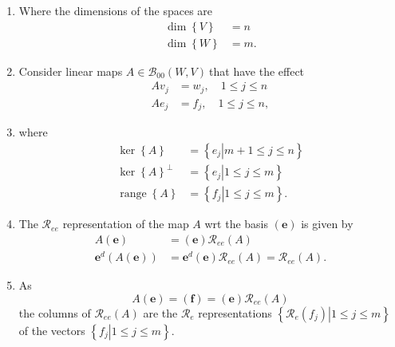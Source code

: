 \documentclass[aps,preprint]{revtex4}%
\begin{document}
\begin{enumerate}
\item Where the dimensions of the spaces are
\begin{align}
\dim\left\{  V\right\}   &  =n\\
\dim\left\{  W\right\}   &  =m.
\end{align}


\item Consider linear maps $A\in\mathcal{B}_{00}\left(  W,V\right)  \ $that
have the effect%
\begin{align}
Av_{j}  &  =w_{j},\quad1\leq j\leq n\\
Ae_{j}  &  =f_{j},\quad1\leq j\leq n,
\end{align}


\item where
\begin{align}
\ker\left\{  A\right\}   &  =\left\{  \left.  e_{j}\right\vert m+1\leq j\leq
n\right\} \\
\ker\left\{  A\right\}  ^{\bot}  &  =\left\{  \left.  e_{j}\right\vert 1\leq
j\leq m\right\} \\
\operatorname*{range}\left\{  A\right\}   &  =\left\{  \left.  f_{j}%
\right\vert 1\leq j\leq m\right\}  .
\end{align}


\item The $\mathcal{R}_{ee}$ representation of the map $A$ wrt the basis
$\left(  \boldsymbol{e}\right)  $ is given by
\begin{align}
A\left(  \boldsymbol{e}\right)   &  =\left(  \boldsymbol{e}\right)
\mathcal{R}_{ee}\left(  A\right) \\
\boldsymbol{e}^{d}\left(  A\left(  \boldsymbol{e}\right)  \right)   &
=\boldsymbol{e}^{d}\left(  \boldsymbol{e}\right)  \mathcal{R}_{ee}\left(
A\right)  =\mathcal{R}_{ee}\left(  A\right)  .
\end{align}


\item As
\begin{equation}
A\left(  \boldsymbol{e}\right)  =\left(  \boldsymbol{f}\right)  =\left(
\boldsymbol{e}\right)  \mathcal{R}_{ee}\left(  A\right)
\end{equation}
the columns of $\mathcal{R}_{ee}\left(  A\right)  $ are the $\mathcal{R}_{e}$
representations $\left\{  \left.  \mathcal{R}_{e}\left(  f_{j}\right)
\right\vert 1\leq j\leq m\right\}  $ of the vectors $\left\{  \left.
f_{j}\right\vert 1\leq j\leq m\right\}  .$


\end{enumerate}
\end{document}
